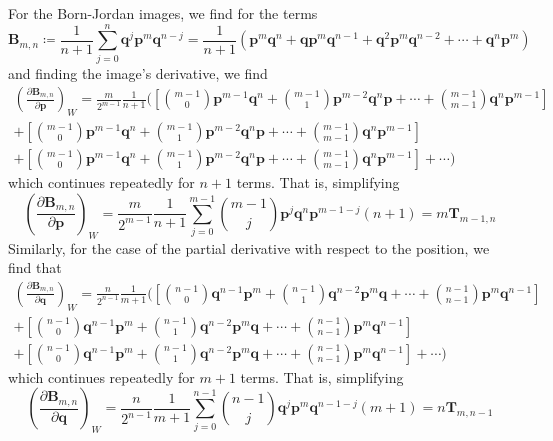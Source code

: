 \documentclass[a4paper]{article}
\theoremstyle{definition}
\begin{document}
For the Born-Jordan images, we find for the terms
\begin{equation}
	\textbf{B}_{m,n}\coloneqq\frac{1}{n+1}\sum_{j=0}^n\textbf{q}^j\textbf{p}^m\textbf{q}^{n-j}=\frac{1}{n+1}\left(\textbf{p}^m\textbf{q}^n+\textbf{q}\textbf{p}^m\textbf{q}^{n-1}+\textbf{q}^2\textbf{p}^m\textbf{q}^{n-2}+\cdots+\textbf{q}^n\textbf{p}^m\right)
\end{equation}
and finding the image's derivative, we find
\begin{multline}
	\left( \frac{\partial\textbf{B}_{m,n}}{\partial\textbf{p}}\right)_W=\frac{m}{2^{m-1}}\frac{1}{n+1}\biggl(\left[\binom{m-1}{0}\textbf{p}^{m-1}\textbf{q}^n+\binom{m-1}{1}\textbf{p}^{m-2}\textbf{q}^n\textbf{p}+\cdots+\binom{m-1}{m-1}\textbf{q}^n\textbf{p}^{m-1}\right]\\+\left[\binom{m-1}{0}\textbf{p}^{m-1}\textbf{q}^n+\binom{m-1}{1}\textbf{p}^{m-2}\textbf{q}^n\textbf{p}+\cdots+\binom{m-1}{m-1}\textbf{q}^n\textbf{p}^{m-1}\right]\\+\left[\binom{m-1}{0}\textbf{p}^{m-1}\textbf{q}^n+\binom{m-1}{1}\textbf{p}^{m-2}\textbf{q}^n\textbf{p}+\cdots+\binom{m-1}{m-1}\textbf{q}^n\textbf{p}^{m-1}\right]+\cdots\biggr)
\end{multline}
which continues repeatedly for $n+1$ terms. That is, simplifying
\begin{equation}
	\left( \frac{\partial\textbf{B}_{m,n}}{\partial\textbf{p}}\right)_W=\frac{m}{2^{m-1}}\frac{1}{n+1}\sum_{j=0}^{m-1}\binom{m-1}{j}\textbf{p}^j\textbf{q}^n\textbf{p}^{m-1-j}(n+1)=m\textbf{T}_{m-1,n}
\end{equation}
Similarly, for the case of the partial derivative with respect to the position, we find that
\begin{multline}
	\left( \frac{\partial\textbf{B}_{m,n}}{\partial\textbf{q}}\right)_W=\frac{n}{2^{n-1}}\frac{1}{m+1}\biggl(\left[\binom{n-1}{0}\textbf{q}^{n-1}\textbf{p}^m+\binom{n-1}{1}\textbf{q}^{n-2}\textbf{p}^m\textbf{q}+\cdots+\binom{n-1}{n-1}\textbf{p}^m\textbf{q}^{n-1}\right]\\+\left[\binom{n-1}{0}\textbf{q}^{n-1}\textbf{p}^m+\binom{n-1}{1}\textbf{q}^{n-2}\textbf{p}^m\textbf{q}+\cdots+\binom{n-1}{n-1}\textbf{p}^m\textbf{q}^{n-1}\right]\\+\left[\binom{n-1}{0}\textbf{q}^{n-1}\textbf{p}^m+\binom{n-1}{1}\textbf{q}^{n-2}\textbf{p}^m\textbf{q}+\cdots+\binom{n-1}{n-1}\textbf{p}^m\textbf{q}^{n-1}\right]+\cdots\biggr)
\end{multline}
which continues repeatedly for $m+1$ terms. That is, simplifying
\begin{equation}
	\left( \frac{\partial\textbf{B}_{m,n}}{\partial\textbf{q}}\right)_W=\frac{n}{2^{n-1}}\frac{1}{m+1}\sum_{j=0}^{n-1}\binom{n-1}{j}\textbf{q}^j\textbf{p}^m\textbf{q}^{n-1-j}(m+1)=n\textbf{T}_{m,n-1}
\end{equation}
\end{document}
